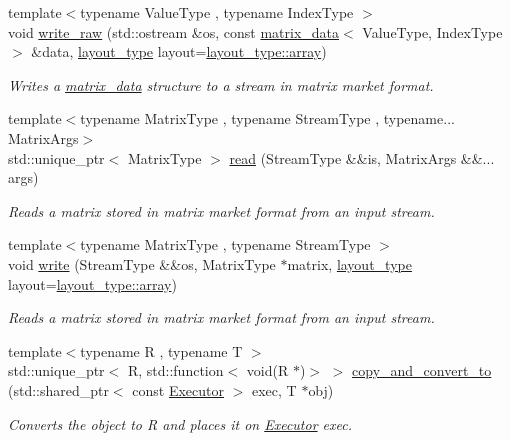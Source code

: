 \begin{DoxyCompactItemize}
{\footnotesize template$<$typename Value\+Type , typename Index\+Type $>$ }\\void \hyperlink{namespacegko_ab31feb99c64fc6df58ac09abd4af69b6}{write\+\_\+raw} (std\+::ostream \&os, const \hyperlink{structgko_1_1matrix__data}{matrix\+\_\+data}$<$ Value\+Type, Index\+Type $>$ \&data, \hyperlink{namespacegko_ae749a5ea11a93c1bcc9158d9a6e9fb68}{layout\+\_\+type} layout=\hyperlink{namespacegko_ae749a5ea11a93c1bcc9158d9a6e9fb68af1f713c9e000f5d3f280adbd124df4f5}{layout\+\_\+type\+::array})
\begin{DoxyCompactList}\small\item\em Writes a \hyperlink{structgko_1_1matrix__data}{matrix\+\_\+data} structure to a stream in matrix market format. \end{DoxyCompactList}\item 
{\footnotesize template$<$typename Matrix\+Type , typename Stream\+Type , typename... Matrix\+Args$>$ }\\std\+::unique\+\_\+ptr$<$ Matrix\+Type $>$ \hyperlink{namespacegko_a92cf0178c1c55419d32d2bb527e57e5b}{read} (Stream\+Type \&\&is, Matrix\+Args \&\&... args)
\begin{DoxyCompactList}\small\item\em Reads a matrix stored in matrix market format from an input stream. \end{DoxyCompactList}\item 
{\footnotesize template$<$typename Matrix\+Type , typename Stream\+Type $>$ }\\void \hyperlink{namespacegko_a859dc47a462721d83728d91ab7fa2148}{write} (Stream\+Type \&\&os, Matrix\+Type $\ast$matrix, \hyperlink{namespacegko_ae749a5ea11a93c1bcc9158d9a6e9fb68}{layout\+\_\+type} layout=\hyperlink{namespacegko_ae749a5ea11a93c1bcc9158d9a6e9fb68af1f713c9e000f5d3f280adbd124df4f5}{layout\+\_\+type\+::array})
\begin{DoxyCompactList}\small\item\em Reads a matrix stored in matrix market format from an input stream. \end{DoxyCompactList}\item 
{\footnotesize template$<$typename R , typename T $>$ }\\std\+::unique\+\_\+ptr$<$ R, std\+::function$<$ void(R $\ast$)$>$ $>$ \hyperlink{namespacegko_ac5cef6e5e9e02b8d77ce01be41117cc0}{copy\+\_\+and\+\_\+convert\+\_\+to} (std\+::shared\+\_\+ptr$<$ const \hyperlink{classgko_1_1Executor}{Executor} $>$ exec, T $\ast$obj)
\begin{DoxyCompactList}\small\item\em Converts the object to R and places it on \hyperlink{classgko_1_1Executor}{Executor} exec. \end{DoxyCompactList}\item 

\end{DoxyCompactItemize}
